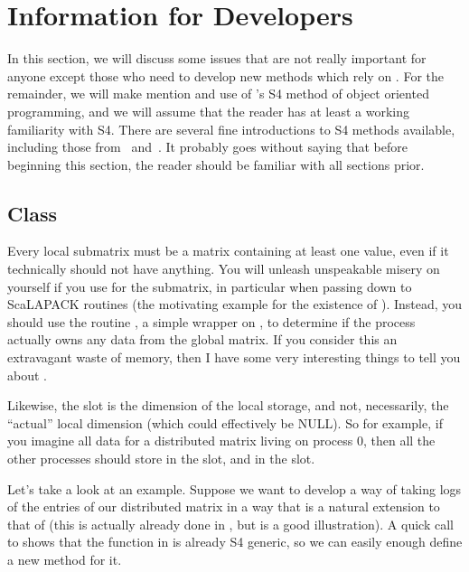 \section{Information for Developers}
\label{sec:devs}

In this section, we will discuss some issues that are not really important for anyone except those who need to develop new methods which rely on .  For the remainder, we will make mention and use of 's S4 method of object oriented programming, and we will assume that the reader has at least a working familiarity with S4.  There are several fine introductions to S4 methods available, including those from~\citep{s4chambers} and~\citep{s4notsoshort}.  It probably goes without saying that before beginning this section, the reader should be familiar with all sections prior.

\subsection{Class }
\label{sec:ictxt}

Every local submatrix must be a matrix containing at least one value, even if it technically should not have anything.  You will unleash unspeakable misery on yourself if you use  for the submatrix, in particular when passing down to ScaLAPACK routines (the motivating example for the existence of ).  Instead, you should use the routine , a simple wrapper on , to determine if the process actually owns any data from the global matrix.  If you consider this an extravagant waste of memory, then I have some very interesting things to tell you about .

Likewise, the slot  is the dimension of the local storage, and not, necessarily, the ``actual'' local dimension (which could effectively be NULL).  So for example, if you imagine all data for a distributed matrix living on process 0, then all the other processes should store  in the  slot, and  in the  slot.

Let's take a look at an example.  Suppose we want to develop a way of taking logs of the entries of our distributed matrix in a way that is a natural extension to that of  (this is actually already done in , but is a good illustration).  A quick call to  shows that the function  in  is already S4 generic, so we can easily enough define a new method for it.

